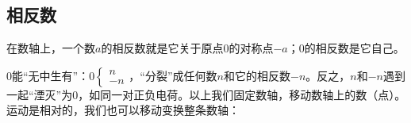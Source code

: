 \documentclass[b5paper]{ctexart}
\begin{document}
\subsection{相反数}

在数轴上，一个数$a$的相反数就是它关于原点0的对称点$-a$；0的相反数是它自己。

\begin{center}
\end{center}

0能“无中生有”：$0 \begin{cases} n \\ -n \end{cases}$，“分裂”成任何数$n$和它的相反数$-n$。反之，$n$和$-n$遇到一起“湮灭”为0，如同一对正负电荷。以上我们固定数轴，移动数轴上的数（点）。运动是相对的，我们也可以移动变换整条数轴：
\end{document}
